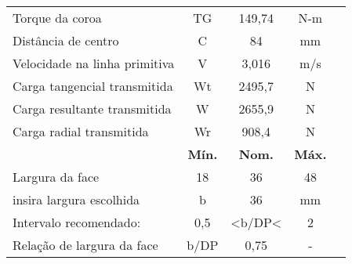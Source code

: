 \begin{table}[]
\begin{tabular}{l c c c c}
Torque da coroa                         & TG              & 149,74          & N-m            \\
Distância de centro                     & C               & 84              & mm             \\
Velocidade na linha primitiva           & V               & 3,016           & m/s            \\
Carga tangencial transmitida            & Wt              & 2495,7          & N              \\
Carga resultante transmitida            & W               & 2655,9          & N              \\
Carga radial transmitida                & Wr              & 908,4           & N              \\
                                        & \textbf{Mín.}   & \textbf{Nom.}   & \textbf{Máx.}  \\
Largura da face                         & 18              & 36              & 48             \\
insira largura escolhida                & b               & 36              & mm             \\
Intervalo recomendado:                  & 0,5             & <b/DP<          & 2              \\
Relação de largura da face              & b/DP            & 0,75            & -             
\end{tabular}
\end{table}